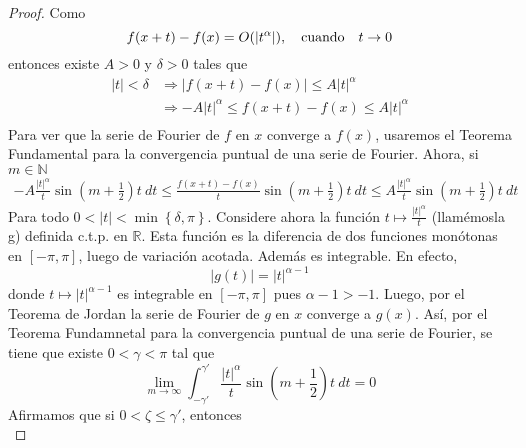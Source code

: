 \documentclass[12pt]{report}
\newcounter{it}
\theoremstyle{largebreak}
\renewcommand{\leq}{\ensuremath{\leqslant}}
\newcommand\abs[1]{\ensuremath{\left|#1\right|}}
\begin{document}
    \begin{proof}
        Como
        \begin{equation*}
            f(x+t)-f(x)=O(\abs{t^\alpha}),\quad\textup{cuando}\quad t\rightarrow 0
        \end{equation*}
        entonces existe $A>0$ y $\delta>0$ tales que
        \begin{equation*}
            \begin{split}
                \abs{t}<\delta&\Rightarrow \abs{f(x+t)-f(x)}\leq A\abs{t}^\alpha\\
                &\Rightarrow -A\abs{t}^\alpha\leq f(x+t)-f(x)\leq A\abs{t}^\alpha\\
            \end{split}
        \end{equation*}
        Para ver que la serie de Fourier de $f$ en $x$ converge a $f(x)$, usaremos el Teorema Fundamental para la convergencia puntual de una serie de Fourier. Ahora, si $m\in\mathbb{N}$
        \begin{equation*}
            \begin{split}
                -A\frac{\abs{t}^\alpha}{t}\sin\left(m+\frac{1}{2}\right)t\:dt \leq \frac{f(x+t)-f(x)}{t}\sin\left(m+\frac{1}{2}\right)t\:dt\leq A\frac{\abs{t}^\alpha}{t}\sin\left(m+\frac{1}{2}\right)t\:dt
            \end{split}
        \end{equation*}
        Para todo $0<\abs{t}<\min\left\{\delta,\pi\right\}$. Considere ahora la función $t\mapsto\frac{\abs{t}^\alpha}{t}$ (llamémosla g) definida c.t.p. en $\mathbb{R}$. Esta función es la diferencia de dos funciones monótonas en $[-\pi,\pi]$, luego de variación acotada. Además es integrable. En efecto,
        \begin{equation*}
            \abs{g(t)}=\abs{t}^{\alpha-1}
        \end{equation*}
        donde $t\mapsto \abs{t}^{\alpha-1}$ es integrable en $[-\pi,\pi]$ pues $\alpha-1>-1$. Luego, por el Teorema de Jordan la serie de Fourier de $g$ en $x$ converge a $g(x)$. Así, por el Teorema Fundamnetal para la convergencia puntual de una serie de Fourier, se tiene que existe $0<\gamma<\pi$ tal que
        \begin{equation*}
            \lim_{ m\rightarrow\infty}\int_{-\gamma'}^{\gamma'}\frac{\abs{t}^\alpha}{t}\sin\left(m+\frac{1}{2}\right)t\:dt=0
        \end{equation*}
        Afirmamos que si $0<\zeta\leq\gamma'$, entonces
        \begin{equation*}

\end{equation*}
\end{proof}
\end{document}
